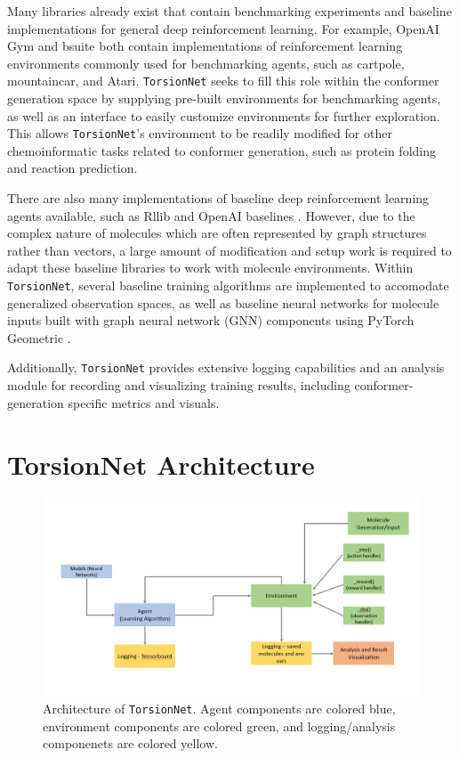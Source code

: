 \documentclass[twoside,11pt]{article}
\newcommand{\code}[1]{\texttt{#1}}
\begin{document}
Many libraries already exist that contain benchmarking experiments and baseline implementations for general deep reinforcement learning. For example, OpenAI Gym \citep{brockman2016gym} and bsuite \citep{osband2020bsuite} both contain implementations of reinforcement learning environments commonly used for benchmarking agents, such as cartpole, mountaincar, and Atari. \code{TorsionNet} seeks to fill this role within the conformer generation space by supplying pre-built environments for benchmarking agents, as well as an interface to easily customize environments for further exploration. This allows \code{TorsionNet}'s environment to be readily modified for other chemoinformatic tasks related to conformer generation, such as protein folding and reaction prediction.

There are also many implementations of baseline deep reinforcement learning agents available, such as Rllib \citep{liang2018rllib} and OpenAI baselines \citep{dhariwal2018baselines}. However, due to the complex nature of molecules which are often represented by graph structures rather than vectors, a large amount of modification and setup work is required to adapt these baseline libraries to work with molecule environments. Within \code{TorsionNet}, several baseline training algorithms are implemented to accomodate generalized observation spaces, as well as baseline neural networks for molecule inputs built with graph neural network (GNN) components using PyTorch Geometric \citep{fey2019geometric}.

Additionally, \code{TorsionNet} provides extensive logging capabilities and an analysis module for recording and visualizing training results, including conformer-generation specific metrics and visuals.

\section{TorsionNet Architecture}

  \begin{figure}[h]
    \centering
    \includegraphics[width=\textwidth]{architecture.png}
    \caption{Architecture of \code{TorsionNet}. Agent components are colored blue, environment components are colored green, and logging/analysis componenets are colored yellow.}
  \end{figure}
\end{document}
